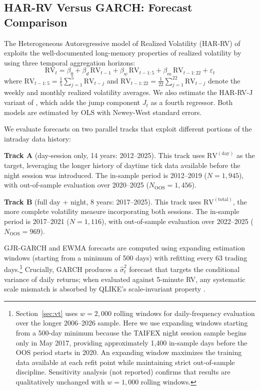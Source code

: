 \subsection{HAR-RV Versus GARCH: Forecast Comparison}
\label{sec:hf_har}

The Heterogeneous Autoregressive model of Realized Volatility (HAR-RV) of \citet{corsi2009} exploits the well-documented long-memory properties of realized volatility by using three temporal aggregation horizons:
\begin{equation}
\text{RV}_t = \beta_0 + \beta_d \, \text{RV}_{t-1} + \beta_w \, \text{RV}_{t-1:5} + \beta_m \, \text{RV}_{t-1:22} + \varepsilon_t
\label{eq:har}
\end{equation}
where $\text{RV}_{t-1:5} = \frac{1}{5}\sum_{j=1}^{5}\text{RV}_{t-j}$ and $\text{RV}_{t-1:22} = \frac{1}{22}\sum_{j=1}^{22}\text{RV}_{t-j}$ denote the weekly and monthly realized volatility averages. We also estimate the HAR-RV-J variant of \citet{andersen2007}, which adds the jump component $J_t$ as a fourth regressor. Both models are estimated by OLS with Newey-West standard errors.

We evaluate forecasts on two parallel tracks that exploit different portions of the intraday data history:

\textbf{Track A} (day-session only, 14 years: 2012--2025). This track uses $\text{RV}^{(\text{day})}$ as the target, leveraging the longer history of daytime tick data available before the night session was introduced. The in-sample period is 2012--2019 ($N = 1{,}945$), with out-of-sample evaluation over 2020--2025 ($N_{\text{OOS}} = 1{,}456$).

\textbf{Track B} (full day + night, 8 years: 2017--2025). This track uses $\text{RV}^{(\text{total})}$, the more complete volatility measure incorporating both sessions. The in-sample period is 2017--2021 ($N = 1{,}116$), with out-of-sample evaluation over 2022--2025 ($N_{\text{OOS}} = 969$).

GJR-GARCH and EWMA forecasts are computed using expanding estimation windows (starting from a minimum of 500 days) with refitting every 63 trading days.\footnote{Section~\ref{sec:vt} uses $w = 2{,}000$ rolling windows for daily-frequency evaluation over the longer 2006--2026 sample. Here we use expanding windows starting from a 500-day minimum because the TAIFEX night session sample begins only in May 2017, providing approximately 1,400 in-sample days before the OOS period starts in 2020. An expanding window maximizes the training data available at each refit point while maintaining strict out-of-sample discipline. Sensitivity analysis (not reported) confirms that results are qualitatively unchanged with $w = 1{,}000$ rolling windows.} Crucially, GARCH produces a $\hat{\sigma}_t^2$ forecast that targets the conditional variance of daily returns; when evaluated against 5-minute RV, any systematic scale mismatch is absorbed by QLIKE's scale-invariant property \citep{patton2011}.

